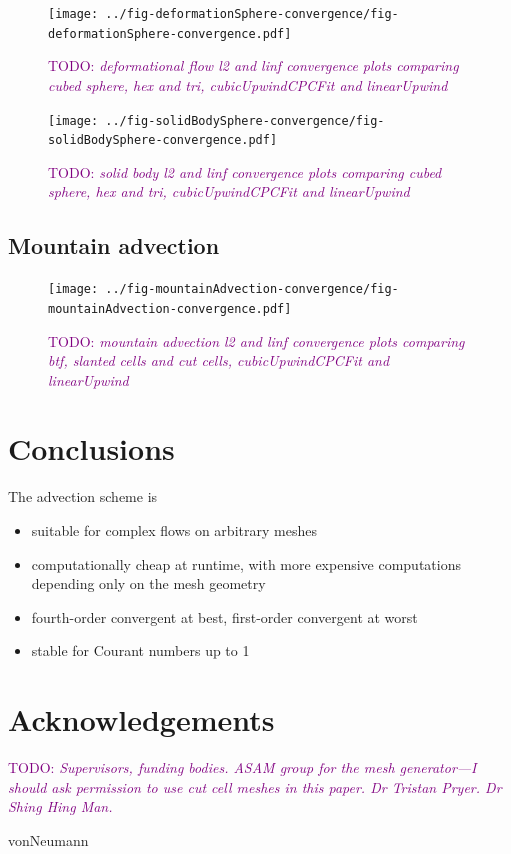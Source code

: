 \documentclass{article}
\newcommand{\TODO}[1]{\textcolor{purple}{TODO: \emph{#1}}}
\begin{document}
\begin{figure}
	\texttt{[image: ../fig-deformationSphere-convergence/fig-deformationSphere-convergence.pdf]}
	\caption{\TODO{deformational flow l2 and linf convergence plots comparing cubed sphere, hex and tri, cubicUpwindCPCFit and linearUpwind}}
\end{figure}


\begin{figure}
	\texttt{[image: ../fig-solidBodySphere-convergence/fig-solidBodySphere-convergence.pdf]}
	\caption{\TODO{solid body l2 and linf convergence plots comparing cubed sphere, hex and tri, cubicUpwindCPCFit and linearUpwind}}
\end{figure}

\subsection{Mountain advection}


\begin{figure}
	\texttt{[image: ../fig-mountainAdvection-convergence/fig-mountainAdvection-convergence.pdf]}
	\caption{\TODO{mountain advection l2 and linf convergence plots comparing btf, slanted cells and cut cells, cubicUpwindCPCFit and linearUpwind}}
\end{figure}

\section{Conclusions}

The advection scheme is
\begin{itemize}
	\item suitable for complex flows on arbitrary meshes
	\item computationally cheap at runtime, with more expensive computations depending only on the mesh geometry
	\item fourth-order convergent at best, first-order convergent at worst
	\item stable for Courant numbers up to 1
\end{itemize}

\section{Acknowledgements}
\TODO{Supervisors, funding bodies.  ASAM group for the mesh generator---I should ask permission to use cut cell meshes in this paper.  Dr Tristan Pryer.  Dr Shing Hing Man.}






 {vonNeumann}
\end{document}
